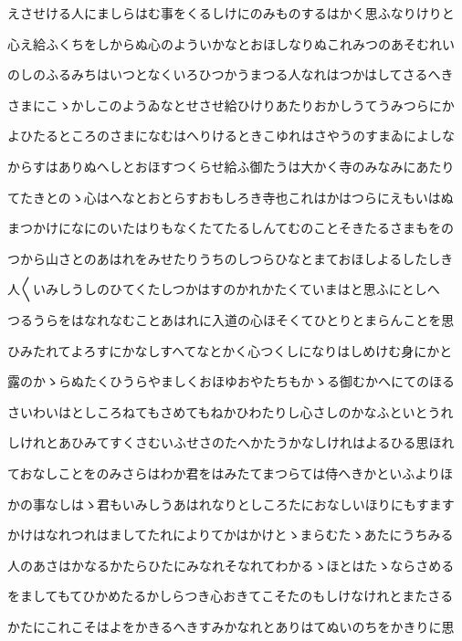 \documentclass[a4paper,11pt,landscape]{ltjtarticle}
\begin{document}
えさせける人にましらはむ事をくるしけにのみものするはかく思ふなりけりと
\par\medskip
心え給ふくちをしからぬ心のよういかなとおほしなりぬこれみつのあそむれい
\par\medskip
のしのふるみちはいつとなくいろひつかうまつる人なれはつかはしてさるへき
\par\medskip
さまにこゝかしこのようゐなとせさせ給ひけりあたりおかしうてうみつらにか
\par\medskip
よひたるところのさまになむはへりけるときこゆれはさやうのすまゐによしな
\par\medskip
からすはありぬへしとおほすつくらせ給ふ御たうは大かく寺のみなみにあたり
\par\medskip
てたきとのゝ心はへなとおとらすおもしろき寺也これはかはつらにえもいはぬ
\par\medskip
まつかけになにのいたはりもなくたてたるしんてむのことそきたるさまもをの
\par\medskip
つから山さとのあはれをみせたりうちのしつらひなとまておほしよるしたしき
\par\medskip
人〱いみしうしのひてくたしつかはすのかれかたくていまはと思ふにとしへ
\par\medskip
つるうらをはなれなむことあはれに入道の心ほそくてひとりとまらんことを思
\par\medskip
ひみたれてよろすにかなしすへてなとかく心つくしになりはしめけむ身にかと
\par\medskip
露のかゝらぬたくひうらやましくおほゆおやたちもかゝる御むかへにてのほる
\par\medskip
さいわいはとしころねてもさめてもねかひわたりし心さしのかなふといとうれ
\par\medskip
しけれとあひみてすくさむいふせさのたへかたうかなしけれはよるひる思ほれ
\par\medskip
ておなしことをのみさらはわか君をはみたてまつらては侍へきかといふよりほ
\par\medskip
かの事なしはゝ君もいみしうあはれなりとしころたにおなしいほりにもすます
\par\medskip
かけはなれつれはましてたれによりてかはかけとゝまらむたゝあたにうちみる
\par\medskip
人のあさはかなるかたらひたにみなれそなれてわかるゝほとはたゝならさめる
\par\medskip
をましてもてひかめたるかしらつき心おきてこそたのもしけなけれとまたさる
\par\medskip
かたにこれこそはよをかきるへきすみかなれとありはてぬいのちをかきりに思
\par\medskip
\end{document}
